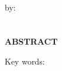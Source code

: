 \clearpage
{}
{}
\begin{center}
   \textbf{\large{\judulen}}\\[0.5cm]
   by:\\
   \penulis\\
   \nim\\[2em]
    \textbf{ABSTRACT}\\[0.5cm]
\end{center}

\lipsum[2-4]

\noindent Key words: \keywords